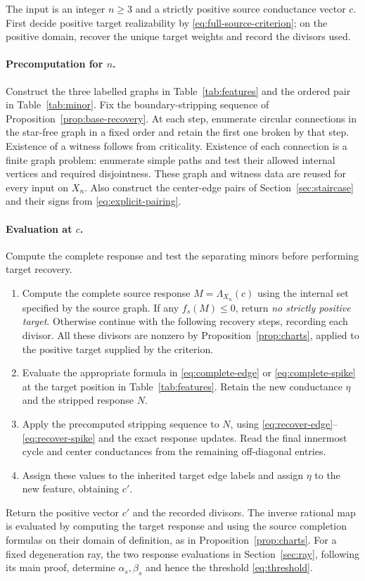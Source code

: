 \documentclass[11pt]{article}
\theoremstyle{definition}
\begin{document}
The input is an integer \(n\ge3\) and a strictly positive source
conductance vector \(c\). First decide positive target realizability
by \eqref{eq:full-source-criterion}; on the positive domain, recover
the unique target weights and record the divisors used.

\paragraph{Precomputation for \(n\).}
Construct the three labelled graphs in Table~\ref{tab:features}
and the ordered pair in Table~\ref{tab:minor}. Fix the
boundary-stripping sequence of Proposition~\ref{prop:base-recovery}.
At each step, enumerate circular connections in the star-free graph
in a fixed order and retain the first one broken by that step.
Existence of a witness follows from criticality. Existence of each
connection is a finite graph problem: enumerate simple paths and
test their allowed internal vertices and required disjointness.
These graph and witness data are reused for every input on \(X_n\).
Also construct the center-edge pairs of Section~\ref{sec:staircase}
and their signs from \eqref{eq:explicit-pairing}.

\paragraph{Evaluation at \(c\).}
Compute the complete response and test the separating minors before
performing target recovery.
\begin{enumerate}
\item Compute the complete source response \(M=\Lambda_{X_n}(c)\)
using the internal set specified by the source graph.
If any $f_s(M)\le0$, return \emph{no strictly positive target}.
Otherwise continue with the following recovery steps, recording each
divisor. All these divisors are nonzero by Proposition~\ref{prop:charts},
applied to the positive target supplied by the criterion.
\item Evaluate the appropriate formula in
\eqref{eq:complete-edge} or \eqref{eq:complete-spike} at the
target position in Table~\ref{tab:features}. Retain the new
conductance \(\eta\) and the stripped response \(N\).
\item Apply the precomputed stripping sequence to \(N\), using
\eqref{eq:recover-edge}--\eqref{eq:recover-spike} and the exact
response updates. Read the final innermost cycle and center
conductances from the remaining off-diagonal entries.
\item Assign these values to the inherited target edge labels and
assign \(\eta\) to the new feature, obtaining \(c'\).
\end{enumerate}
Return the positive vector \(c'\) and the recorded divisors.
The inverse rational map is evaluated by computing the target response
and using the source completion formulas on their domain of definition,
as in Proposition~\ref{prop:charts}.
For a fixed degeneration ray, the two response evaluations in
Section~\ref{sec:ray}, following its main proof, determine
$\alpha_s,\beta_s$ and hence the threshold \eqref{eq:threshold}.
\end{document}
